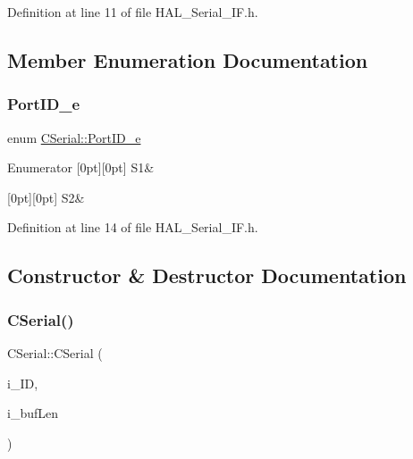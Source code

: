 Definition at line 11 of file H\+A\+L\+\_\+\+Serial\+\_\+\+I\+F.\+h.



\subsection{Member Enumeration Documentation}
\mbox{\label{class_c_serial_a000039540cc90b18bafacf5744e7eda2}} 
\subsubsection{\texorpdfstring{Port\+I\+D\+\_\+e}{PortID\_e}}
{\footnotesize\ttfamily enum \mbox{\hyperlink{class_c_serial_a000039540cc90b18bafacf5744e7eda2}{C\+Serial\+::\+Port\+I\+D\+\_\+e}}}

\begin{DoxyEnumFields}{Enumerator}
[0pt][0pt]{}\mbox{\label{class_c_serial_a000039540cc90b18bafacf5744e7eda2a2a245d3c55e5b6e7052daf261924ce08}} 
S1&\\
\hline

[0pt][0pt]{}\mbox{\label{class_c_serial_a000039540cc90b18bafacf5744e7eda2a8cc95f4591147b0df028e003f82220a1}} 
S2&\\
\hline

\end{DoxyEnumFields}


Definition at line 14 of file H\+A\+L\+\_\+\+Serial\+\_\+\+I\+F.\+h.



\subsection{Constructor \& Destructor Documentation}
\mbox{\label{class_c_serial_a3b2b31de1529b884b8d5e354586ee981}} 
\subsubsection{\texorpdfstring{C\+Serial()}{CSerial()}}
{\footnotesize\ttfamily C\+Serial\+::\+C\+Serial (\begin{DoxyParamCaption}\item[{\mbox{\hyperlink{class_c_serial_a000039540cc90b18bafacf5744e7eda2}{Port\+I\+D\+\_\+e}}}]{i\+\_\+\+ID,  }\item[{\mbox{\hyperlink{_a_d_a_s___types_8h_a1f1825b69244eb3ad2c7165ddc99c956}{uint16\+\_\+t}}}]{i\+\_\+buf\+Len }\end{DoxyParamCaption})}



